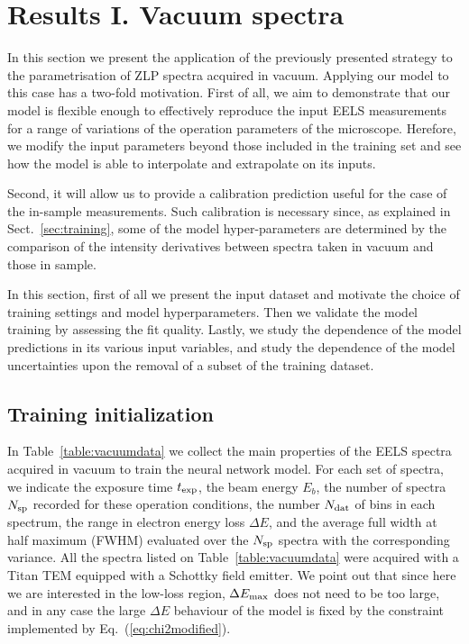 \section{Results I. Vacuum spectra}
\label{sec:results_vacuum}

In this section we present the application of the previously presented strategy 
to the parametrisation of ZLP spectra acquired in vacuum.
%
Applying our model to this case has a two-fold motivation.
%
First of all, we aim to demonstrate that our model is flexible enough to effectively reproduce the
input EELS measurements for a range of variations of the operation parameters of the microscope.
%
Herefore, we modify the input parameters beyond those included in the training set
and see how the model is able to interpolate and extrapolate on its inputs.

Second, it will allow us to provide a calibration prediction
useful for the case of the in-sample measurements.
%
Such calibration is necessary since, as explained in Sect.~\ref{sec:training}, some of the model
hyper-parameters are determined by the comparison of the intensity derivatives
between spectra taken in vacuum and those in sample.

In this section, first of all we present the input dataset and motivate the choice
of training settings and model hyperparameters.
%
Then we validate the model training by assessing the fit quality.
%
Lastly, we study the dependence of the model predictions in its various input
variables, and study the dependence of the model uncertainties upon
the removal of a subset of the training dataset.

\subsection{Training initialization}

In Table~\ref{table:vacuumdata} we collect the main properties of the EELS spectra acquired in vacuum to train the neural
    network model.  For each set of spectra, we indicate the exposure time $t_{\rm exp}$, the beam energy
    $E_b$, the number of spectra $N_{\rm sp}$ recorded for these operation conditions, the number $N_{\rm dat}$ of
    bins in each spectrum, the range in electron energy loss $\Delta E$,
    and the average full width at half maximum (FWHM)
    evaluated over the $N_{\rm sp}$ spectra with the corresponding variance.
    All the spectra listed on Table~\ref{table:vacuumdata}
    were acquired with a Titan TEM equipped with a Schottky field emitter.
    We point out that since here
    we are interested in the low-loss region, $\Delta E_{\rm max}$ does not need
    to be too large, and in any case the large $\Delta E$ behaviour of the model is fixed
    by the constraint implemented by Eq.~(\ref{eq:chi2modified}).

